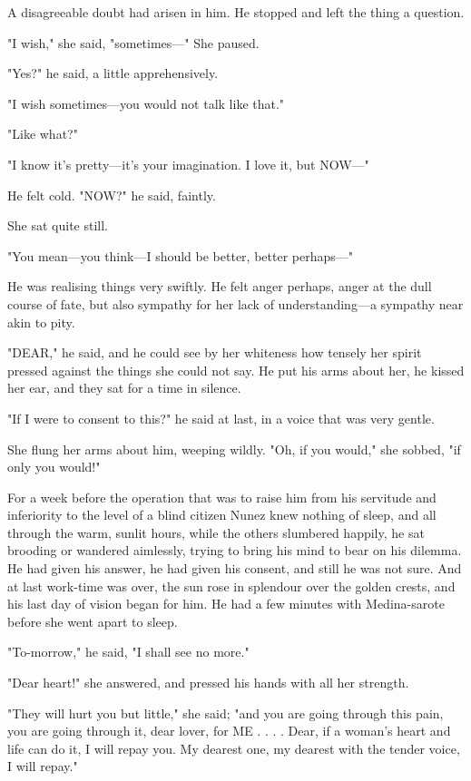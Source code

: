 \documentclass[submission]{sffms}
\begin{document}
A disagreeable doubt had arisen in him. He stopped and left the thing
a question.

"I wish," she said, "sometimes---" She paused.

"Yes?" he said, a little apprehensively.

"I wish sometimes---you would not talk like that."

"Like what?"

"I know it's pretty---it's your imagination. I love it, but NOW---"

He felt cold. "NOW?" he said, faintly.

She sat quite still.

"You mean---you think---I should be better, better perhaps---"

He was realising things very swiftly. He felt anger perhaps, anger at
the dull course of fate, but also sympathy for her lack of
understanding---a sympathy near akin to pity.

"DEAR," he said, and he could see by her whiteness how tensely her
spirit pressed against the things she could not say. He put his arms
about her, he kissed her ear, and they sat for a time in silence.

"If I were to consent to this?" he said at last, in a voice that was
very gentle.

She flung her arms about him, weeping wildly. "Oh, if you would," she
sobbed, "if only you would!"

For a week before the operation that was to raise him from his
servitude and inferiority to the level of a blind citizen Nunez knew
nothing of sleep, and all through the warm, sunlit hours, while the
others slumbered happily, he sat brooding or wandered aimlessly,
trying to bring his mind to bear on his dilemma.  He had given his
answer, he had given his consent, and still he was not sure.  And at
last work-time was over, the sun rose in splendour over the golden
crests, and his last day of vision began for him. He had a few minutes
with Medina-sarote before she went apart to sleep.

"To-morrow," he said, "I shall see no more."

"Dear heart!" she answered, and pressed his hands with all her
strength.

"They will hurt you but little," she said; "and you are going through
this pain, you are going through it, dear lover, for ME . . . . Dear,
if a woman's heart and life can do it, I will repay you. My dearest
one, my dearest with the tender voice, I will repay."
\end{document}
